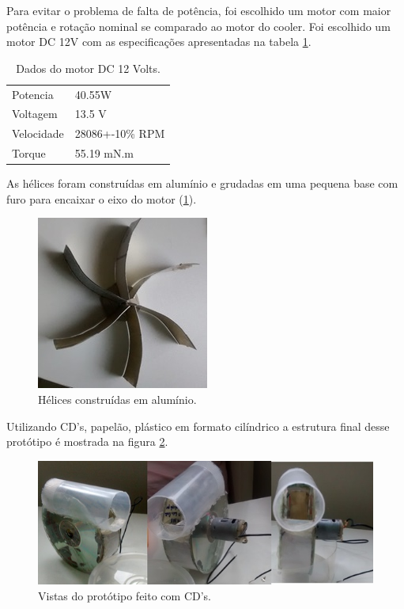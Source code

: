		Para evitar o problema de falta de potência, foi escolhido um motor com maior potência e rotação nominal se comparado ao motor do cooler. Foi escolhido um motor DC 12V com as especificações apresentadas na tabela \ref{tab:motor_12V}.

		\begin{table}[H]
			\centering
			\caption{Dados do motor DC 12 Volts.}
			\label{tab:motor_12V}
			\begin{tabular}{ll}
				Potencia   & 40.55W          \\
				Voltagem   & 13.5 V          \\
				Velocidade & 28086+-10\% RPM \\
				Torque     & 55.19 mN.m     
			\end{tabular}
		\end{table}

		As hélices foram construídas em alumínio e grudadas em uma pequena base com furo para encaixar o eixo do motor (\ref{img:hélices_alumínio}).

		\begin{figure}[H]
			\centering
			\includegraphics[scale=1]{figuras/asppc2_7.jpg}
			\caption{Hélices construídas em alumínio.}
			\label{img:hélices_alumínio}
		\end{figure}

		Utilizando CD’s, papelão, plástico em formato cilíndrico a estrutura final desse protótipo é mostrada na figura \ref{img:protótipo_CD}.  

		\begin{figure}[H]
			\centering
			\includegraphics[scale=1]{figuras/asppc2_8.jpg}
			\caption{Vistas do protótipo feito com CD’s.}
			\label{img:protótipo_CD}
		\end{figure}

